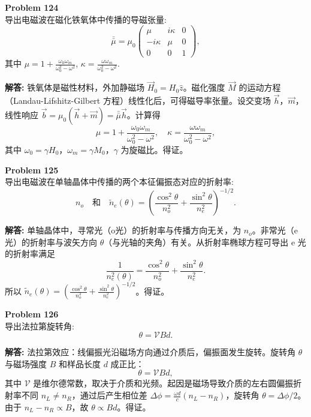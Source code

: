 \documentclass[12pt, a4paper, oneside]{ctexart}
\newenvironment{solution}{\par\noindent\textbf{解答:}\quad}{\par}
\begin{document}
\begin{mdframed}[backgroundcolor=gray!10, linewidth=0pt]
    \textbf{Problem 124} \\
    导出电磁波在磁化铁氧体中传播的导磁张量:
    \[
    \bar{\bar{\mu}} = \mu_0 \begin{pmatrix}
        \mu & i\kappa & 0 \\
        -i\kappa & \mu & 0 \\
        0 & 0 & 1
    \end{pmatrix},
    \]
    其中 $\mu = 1 + \frac{\omega_0 \omega_m}{\omega_0^2 - \omega^2}$, $\kappa = \frac{\omega \omega_m}{\omega_0^2 - \omega^2}$.
\end{mdframed}
\begin{solution}
    铁氧体是磁性材料，外加静磁场 $\vec{H}_0 = H_0 \hat{z}$。磁化强度 $\vec{M}$ 的运动方程（Landau-Lifshitz-Gilbert 方程）线性化后，可得磁导率张量。设交变场 $\vec{h}$，$\vec{m}$，线性响应 $\vec{b} = \mu_0 (\vec{h} + \vec{m}) = \bar{\bar{\mu}} \vec{h}$。计算得
    \[
    \mu = 1 + \frac{\omega_0 \omega_m}{\omega_0^2 - \omega^2}, \quad \kappa = \frac{\omega \omega_m}{\omega_0^2 - \omega^2},
    \]
    其中 $\omega_0 = \gamma H_0$，$\omega_m = \gamma M_0$，$\gamma$ 为旋磁比。得证。
\end{solution}

\begin{mdframed}[backgroundcolor=gray!10, linewidth=0pt]
    \textbf{Problem 125} \\
    导出电磁波在单轴晶体中传播的两个本征偏振态对应的折射率:
    \[
    n_o \quad \text{和} \quad \tilde{n}_e(\theta) = \left( \frac{\cos^2\theta}{n_o^2} + \frac{\sin^2\theta}{n_e^2} \right)^{-1/2}.
    \]
\end{mdframed}
\begin{solution}
    单轴晶体中，寻常光（o光）的折射率与传播方向无关，为 $n_o$。非常光（e光）的折射率与波矢方向 $\theta$（与光轴的夹角）有关。从折射率椭球方程可导出 e 光的折射率满足
    \[
    \frac{1}{n_e^2(\theta)} = \frac{\cos^2\theta}{n_o^2} + \frac{\sin^2\theta}{n_e^2}.
    \]
    所以 $\tilde{n}_e(\theta) = \left( \frac{\cos^2\theta}{n_o^2} + \frac{\sin^2\theta}{n_e^2} \right)^{-1/2}$。得证。
\end{solution}

\begin{mdframed}[backgroundcolor=gray!10, linewidth=0pt]
    \textbf{Problem 126} \\
    导出法拉第旋转角:
    \[
    \theta = \mathcal{V} B d.
    \]
\end{mdframed}
\begin{solution}
    法拉第效应：线偏振光沿磁场方向通过介质后，偏振面发生旋转。旋转角 $\theta$ 与磁场强度 $B$ 和样品长度 $d$ 成正比：
    \[
    \theta = \mathcal{V} B d,
    \]
    其中 $\mathcal{V}$ 是维尔德常数，取决于介质和光频。起因是磁场导致介质的左右圆偏振折射率不同 $n_L \neq n_R$，通过后产生相位差 $\Delta \phi = \frac{\omega d}{c} (n_L - n_R)$，旋转角 $\theta = \Delta \phi / 2$。由于 $n_L - n_R \propto B$，故 $\theta \propto B d$。得证。
\end{solution}
\end{document}
